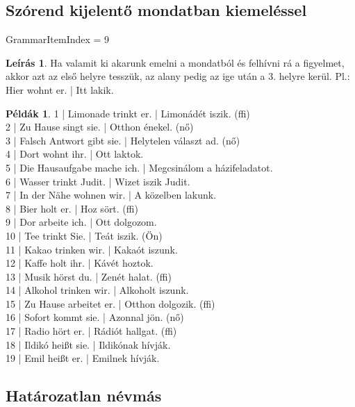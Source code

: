 \documentclass{article}
\theoremstyle{definition}
\newtheorem*{exmp}{Példák}
\newtheorem*{desc}{Leírás}
\begin{document}
\subsection{Szórend kijelentő mondatban kiemeléssel}

GrammarItemIndex = 9

\begin{desc}
Ha valamit ki akarunk emelni a mondatból és felhívni rá a figyelmet,
akkor azt az első helyre tesszük, az alany pedig az ige után a 3. helyre kerül.
Pl.: Hier wohnt er. | Itt lakik.
\end{desc}

\begin{exmp}
1 | Limonade trinkt er. | Limonádét iszik. (ffi)\\
2 | Zu Hause singt sie. | Otthon énekel. (nő)\\
3 | Falsch Antwort gibt sie. | Helytelen választ ad. (nő)\\
4 | Dort wohnt ihr. | Ott laktok.\\
5 | Die Hausaufgabe mache ich. | Megcsinálom a házifeladatot.\\
6 | Wasser trinkt Judit. | Wizet iszik Judit.\\
7 | In der Nähe wohnen wir. | A közelben lakunk.\\
8 | Bier holt er. | Hoz sört. (ffi)\\
9 | Dor arbeite ich. | Ott dolgozom.\\
10 | Tee trinkt Sie. | Teát iszik. (Ön)\\
11 | Kakao trinken wir. | Kakaót iszunk.\\
12 | Kaffe holt ihr. | Kávét hoztok.\\
13 | Musik hörst du. | Zenét halat. (ffi)\\
14 | Alkohol trinken wir. | Alkoholt iszunk.\\
15 | Zu Hause arbeitet er. | Otthon dolgozik. (ffi)\\
16 | Sofort kommt sie. | Azonnal jön. (nő)\\
17 | Radio hört er. | Rádiót hallgat. (ffi)\\
18 | Ildikó heißt sie. | Ildikónak hívják.\\
19 | Emil heißt er. | Emilnek hívják.\\
\end{exmp}

\subsection{Határozatlan névmás}
\end{document}
